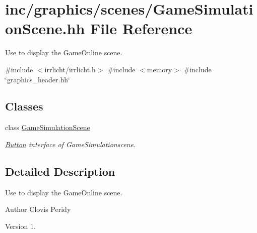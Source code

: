 \hypertarget{GameSimulationScene_8hh}{}\section{inc/graphics/scenes/\+Game\+Simulation\+Scene.hh File Reference}
\label{GameSimulationScene_8hh}


Use to display the Game\+Online scene.  


{\ttfamily \#include $<$irrlicht/irrlicht.\+h$>$}\newline
{\ttfamily \#include $<$memory$>$}\newline
{\ttfamily \#include \char`\"{}graphics\+\_\+header.\+hh\char`\"{}}\newline
\subsection*{Classes}
\begin{DoxyCompactItemize}
\item 
class \hyperlink{classGameSimulationScene}{Game\+Simulation\+Scene}
\begin{DoxyCompactList}\small\item\em \hyperlink{classButton}{Button} interface of Game\+Simulationscene. \end{DoxyCompactList}\end{DoxyCompactItemize}


\subsection{Detailed Description}
Use to display the Game\+Online scene. 

\begin{DoxyAuthor}{Author}
Clovis Peridy 
\end{DoxyAuthor}
\begin{DoxyVersion}{Version}
1. 
\end{DoxyVersion}
